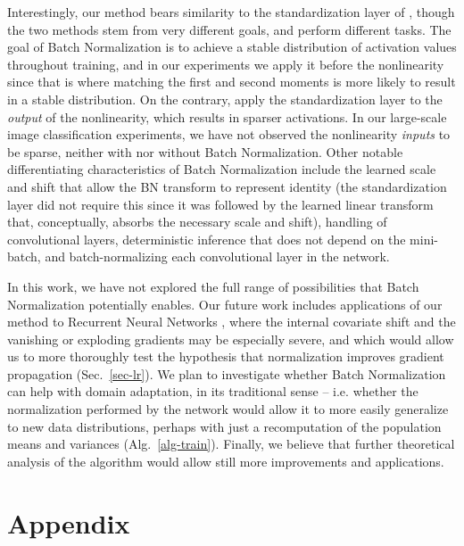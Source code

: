 \documentclass[twocolumn]{article}
\begin{document}
Interestingly, our method bears similarity to the standardization layer of
\cite{gulcehre}, though the two methods stem from very different goals, and
perform different tasks. The goal of Batch Normalization is to achieve a stable
distribution of activation values throughout training, and in our experiments we
apply it before the nonlinearity since that is where matching the first and
second moments is more likely to result in a stable distribution. On the
contrary, \cite{gulcehre} apply the standardization layer to the {\em output} of
the nonlinearity, which results in sparser activations. In our large-scale image
classification experiments, we have not observed the nonlinearity {\em inputs}
to be sparse, neither with nor without Batch Normalization. Other notable
differentiating characteristics of Batch Normalization include the learned scale
and shift that allow the BN transform to represent identity (the standardization
layer did not require this since it was followed by the learned linear transform
that, conceptually, absorbs the necessary scale and shift), handling of
convolutional layers, deterministic inference that does not depend on the
mini-batch, and batch-normalizing each convolutional layer in the network.


In this work, we have not explored the full range of possibilities
that Batch Normalization potentially enables. Our future work includes
applications of our method to Recurrent Neural Networks
\cite{pascanu-rnn}, where the internal covariate shift and the
vanishing or exploding gradients may be especially severe, and which
would allow us to more thoroughly test the hypothesis that
normalization improves gradient propagation (Sec.~\ref{sec-lr}). We
plan to investigate whether Batch Normalization can help with domain
adaptation, in its traditional sense -- i.e. whether the normalization
performed by the network would allow it to more easily generalize to
new data distributions, perhaps with just a recomputation of the
population means and variances (Alg.~\ref{alg-train}). Finally, we
believe that further theoretical analysis of the algorithm would allow
still more improvements and applications.






\section*{Appendix}
\end{document}
